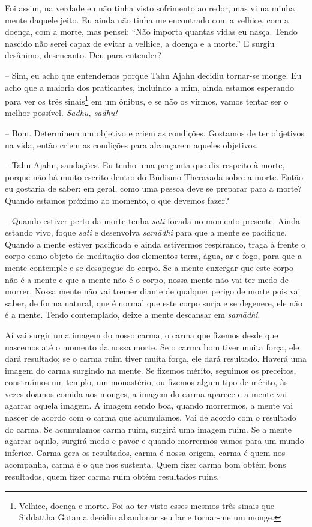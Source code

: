 Foi assim, na verdade eu não tinha visto sofrimento ao redor, mas vi
na minha mente daquele jeito. Eu ainda não tinha me encontrado com a
velhice, com a doença, com a morte, mas pensei: “Não importa quantas
vidas eu nasça. Tendo nascido não serei capaz de evitar a velhice, a
doença e a morte.” E surgiu desânimo, desencanto. Deu para entender?

-- Sim, eu acho que entendemos porque Tahn Ajahn decidiu
tornar-se monge. Eu acho que a maioria dos praticantes, incluindo a
mim, ainda estamos esperando para ver os três sinais\footnote{Velhice,
doença e morte. Foi ao ter visto esses mesmos três sinais que Siddattha
Gotama decidiu abandonar seu lar e tornar-me um monge.} em um ônibus,
e se não os virmos, vamos tentar ser o melhor possível.
\textit{Sādhu, sādhu!}

-- Bom. Determinem um objetivo e criem as condições. Gostamos de
ter objetivos na vida, então criem as condições para alcançarem aqueles
objetivos. 

-- Tahn Ajahn, saudações. Eu tenho uma pergunta que diz respeito à
morte, porque não há muito escrito dentro do Budismo Theravada sobre a
morte. Então eu gostaria de saber: em geral, como uma pessoa deve se
preparar para a morte? Quando estamos próximo ao momento, o que devemos
fazer?

-- Quando estiver perto da morte tenha \textit{sati} focada no
momento presente. Ainda estando vivo, foque \textit{sati} e desenvolva
\textit{samādhi} para que a mente se pacifique. Quando a mente
estiver pacificada e ainda estivermos respirando, traga à frente o
corpo como objeto de meditação dos elementos terra, água, ar e fogo,
para que a mente contemple e se desapegue do corpo. Se a mente enxergar
que este corpo não é a mente e que a mente não é o corpo, nossa mente
não vai ter medo de morrer. Nossa mente não vai tremer diante de
qualquer perigo de morte pois vai saber, de forma natural, que é normal
que este corpo surja e se degenere, ele não é a mente. Tendo
contemplado, deixe a mente descansar em \textit{samādhi}.

Aí vai surgir uma imagem do nosso carma, o carma que fizemos desde
que nascemos até o momento da nossa morte. Se o carma bom tiver muita
força, ele dará resultado; se o carma ruim tiver muita força, ele dará
resultado. Haverá uma imagem do carma surgindo na mente. Se fizemos
mérito, seguimos os preceitos, construímos um templo, um monastério, ou
fizemos algum tipo de mérito, às vezes doamos comida aos monges, a
imagem do carma aparece e a mente vai agarrar aquela imagem. A imagem
sendo boa, quando morrermos, a mente vai nascer de acordo com o carma
que acumulamos. Vai de acordo com o resultado do carma. Se acumulamos
carma ruim, surgirá uma imagem ruim. Se a mente agarrar aquilo, surgirá
medo e pavor e quando morrermos vamos para um mundo inferior. Carma
gera os resultados, carma é nossa origem, carma é quem nos acompanha,
carma é o que nos sustenta. Quem fizer carma bom obtém bons resultados,
quem fizer carma ruim obtém resultados ruins.

